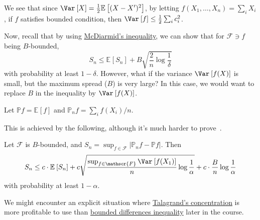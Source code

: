\begin{note}
  We see that since \(\Var_{}\left[X \right] = \frac{1}{2}\mathbb{E}_{}\left[(X-X^{\prime} )^2 \right]\), by letting \(f(X_1, \dots , X_n) = \sum_{i} X_i\), if \(f\) satisfies bounded condition, then \(\Var_{}\left[f \right] \leq \frac{1}{2}\sum_{i} c_i^2\).
\end{note}

Now, recall that by using \hyperref[thm:McDiarmid-inequality]{McDiarmid's inequality}, we can show that for \(\mathscr{F} \ni f\) being \(B\)-bounded,
\[
  S_n \leq \mathbb{E}_{}\left[S_n \right] + B \sqrt{\frac{2}{n}\log \frac{1}{\delta }}
\]
with probability at least \(1 - \delta \). However, what if the variance \(\Var_{}\left[f(X) \right] \) is small, but the maximum spread (\(B\)) is very large? In this case, we would want to replace \(B\) in the inequality by \(\Var_{}\left[f(X) \right] \).

\begin{notation}
  Let \(\mathbb{P} f = \mathbb{E}_{}\left[f \right] \) and \(\mathbb{P} _n f = \sum_{i} f(X_i) / n\).
\end{notation}

This is achieved by the following, although it's much harder to prove~\cite[]{boucheron2013concentration}.

\begin{theorem}\label{thm:Talagrand-concentration-inequality}
  Let \(\mathscr{F} \) is \(B\)-bounded, and \(S_n = \sup _{f\in \mathscr{F}} \vert \mathbb{P} _n f - \mathbb{P} f \vert \). Then
  \[
    S_n \leq c\cdot \mathbb{E}_{}\left[S_n \right] + c \sqrt{\frac{\sup_{f\in \mathscr{F}} \Var_{}\left[f(X_1) \right] }{n} \log \frac{1}{\alpha }} + c\cdot \frac{B}{n} \log \frac{1}{\alpha }
  \]
  with probability at least \(1 - \alpha \).
\end{theorem}

\begin{remark}
  We might encounter an explicit situation where \hyperref[thm:Talagrand-concentration-inequality]{Talagrand's concentration} is more profitable to use than \hyperref[thm:McDiarmid-inequality]{bounded differences inequality} later in the course.
\end{remark}